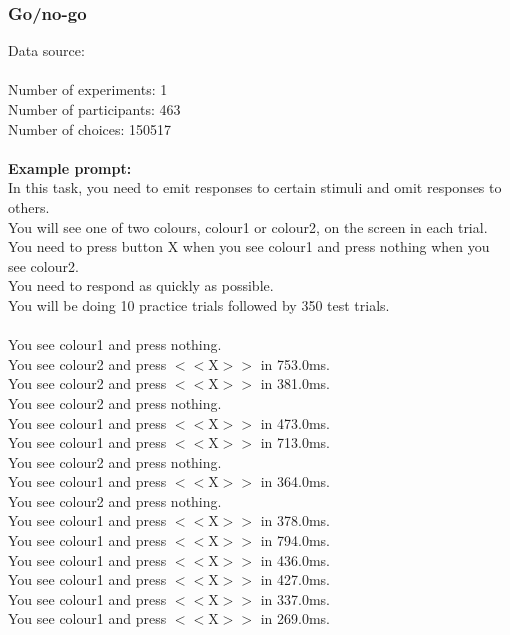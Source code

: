 \documentclass[pdflatex,sn-nature]{sn-jnl}%
\theoremstyle{thmstyleone}%
\theoremstyle{thmstyletwo}%
\theoremstyle{thmstylethree}%
\begin{document}
\subsubsection*{Go/no-go}
Data source: \cite{enkavi2019large} \\ $~$ \\
Number of experiments: 1 $~$\\ 
Number of participants: 463 $~$\\ 
Number of choices: 150517 $~$\\ 
 $~$\\ 
\textbf{Example prompt:}
 $~$\\ 
In this task, you need to emit responses to certain stimuli and omit responses to others. $~$\\ 
You will see one of two colours, colour1 or colour2, on the screen in each trial. $~$\\ 
You need to press button X when you see colour1 and press nothing when you see colour2. $~$\\ 
You need to respond as quickly as possible. $~$\\ 
You will be doing 10 practice trials followed by 350 test trials. $~$\\ 
 $~$\\ 
You see colour1 and press nothing. $~$\\ 
You see colour2 and press $<<$X$>>$ in 753.0ms. $~$\\ 
You see colour2 and press $<<$X$>>$ in 381.0ms. $~$\\ 
You see colour2 and press nothing. $~$\\ 
You see colour1 and press $<<$X$>>$ in 473.0ms. $~$\\ 
You see colour1 and press $<<$X$>>$ in 713.0ms. $~$\\ 
You see colour2 and press nothing. $~$\\ 
You see colour1 and press $<<$X$>>$ in 364.0ms. $~$\\ 
You see colour2 and press nothing. $~$\\ 
You see colour1 and press $<<$X$>>$ in 378.0ms. $~$\\ 
You see colour1 and press $<<$X$>>$ in 794.0ms. $~$\\ 
You see colour1 and press $<<$X$>>$ in 436.0ms. $~$\\ 
You see colour1 and press $<<$X$>>$ in 427.0ms. $~$\\ 
You see colour1 and press $<<$X$>>$ in 337.0ms. $~$\\ 
You see colour1 and press $<<$X$>>$ in 269.0ms. $~$\\ 
\end{document}
